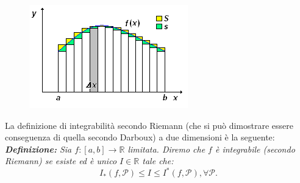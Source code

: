 \documentclass[10pt]{article}
\theoremstyle{plain}
\theoremstyle{definition}
\begin{document}
\begin{figure}[ht]
\centering
\centerline{\includegraphics[width=75 mm,scale=1]{fig2.png}}
\label{fig: }
\end{figure}


\bigskip La definizione di integrabilità secondo Riemann (che si può dimostrare essere conseguenza di quella secondo Darboux) a due dimensioni è la seguente:
\\ \textit{\textbf{Definizione:} Sia $f:[a,b]\to \mathbb{R}$ limitata. Diremo che $f$ è integrabile (secondo Riemann) se esiste ed è unico $I\in \mathbb{R}$ tale che:
\begin{equation*}
    I_*(f,\mathcal{P})\leq I \leq I^*(f,\mathcal{P}), \forall \mathcal{P}.
\end{equation*}
}
\end{document}
